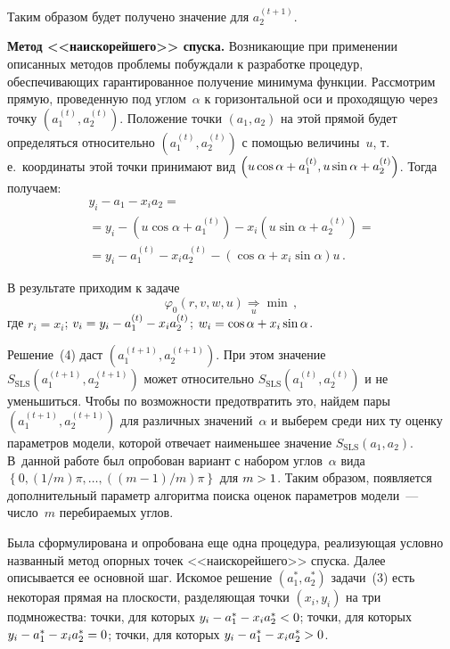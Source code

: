 \begin{multicols}{2}
     Таким образом будет получено значение для $a_2^{(t+1)}$.

     \smallskip

     \textbf{Метод <<наискорейшего>> спуска.} Возникающие при
применении описанных методов проблемы побуждали к разработке процедур,
обеспечивающих гарантированное получение минимума функции. Рассмотрим
прямую, проведенную под углом~$\alpha$ к горизонтальной оси и проходящую
через точку $\left( a_1^{(t)}, a_2^{(t)}\right)$. Положение точки $(a_1,a_2)$ на
этой прямой будет определяться относительно $\left( a_1^{(t)}, a_2^{(t)}\right)$
с помощью величины~$u$, т.\,е.\ координаты этой точки принимают вид $\left( u
\cos\alpha \hm+ a_1^{(t)}, u\sin\alpha\hm+a_2^{(t)}\right)$. Тогда получаем:
     \begin{multline*}
     y_i -a_1 -x_ia_2 ={}\\
     {}= y_i -\left( u\cos\alpha + a_1^{(t)}\right) -x_i \left(
u\sin\alpha + a_2^{(t)}\right)={}\\
     {}= y_i -a_1^{(t)} -x_i a_2^{(t)} -\left( \cos\alpha +x_i\sin\alpha\right) u\,.
     \end{multline*}

     В результате приходим к задаче
     \begin{equation}
     \varphi_0(r,v,w,u)\underset{u}{\Rightarrow}\min\,,
     \label{e4-kri}
     \end{equation}
где $r_i=x_i$; $v_i=y_i\hm- a_1^{(t)} \hm- x_i a_2^{(t)}$; $w_i\hm= \cos\alpha
\hm+ x_i\sin\alpha$.

     Решение~(4) даст $\left( a_1^{(t+1)}, a_2^{(t+1)}\right)$. При этом
значение $S_{\mathrm{SLS}} \left( a_1^{(t+1)}, a_2^{(t+1)}\right)$ может относительно
$S_{\mathrm{SLS}} \left( a_1^{(t)}, a_2^{(t)}\right)$ и не уменьшиться. Чтобы по
возможности предотвратить это, найдем пары $\left( a_1^{(t+1)},
a_2^{(t+1)}\right)$ для различных значений~$\alpha$ и выберем среди них ту
оценку параметров модели, которой отвечает наименьшее значение
$S_{\mathrm{SLS}}(a_1,a_2)$. В~данной работе был опробован вариант с набором
углов~$\alpha$ вида
     $ \left\{ 0, (1/m)\pi,\ldots , ((m-1)/m)\pi\right\}$ для $m\hm>1$.
Таким образом, появляется дополнительный параметр алгоритма поиска оценок
параметров модели~--- чис\-ло~$m$ перебираемых углов.

     Была сформулирована и опробована еще одна процедура, реализующая
условно названный метод опорных точек <<наискорейшего>> спуска. Далее
описывается ее основной шаг. Искомое решение $(a_1^*, a_2^*)$ задачи~(3)
есть некоторая прямая на плоскости, разделяющая точки $(x_i,y_i)$ на три
подмножества: точки, для которых $y_i\hm- a_1^* \hm- x_i a_2^*\hm<0$; точки,
для которых $y_i\hm- a_1^* \hm- x_i a_2^*\hm=0$; точки, для которых $y_i\hm-
a_1^*\hm- x_ia_2^*\hm>0$.


\end{multicols}
